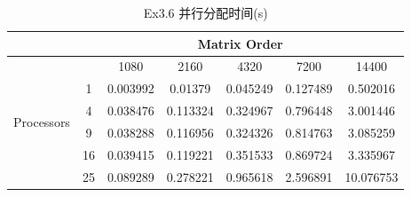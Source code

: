 \documentclass[UTF8]{article}
\begin{document}
    \begin{table}[h]
        \caption{Ex3.6 并行分配时间(s)}
        \label{tab:my-table}
        \centering
        \scalebox{0.8} {
        \begin{tabular}{|c|c|c|c|c|c|c|}
        \hline
                                    & \multicolumn{6}{c|}{Matrix Order}            \\ \hline
        \multirow{6}{*}{Processors} &    & 1080     & 2160     & 4320     & 7200     & 14400     \\ \cline{2-7} 
                                    & 1  & 0.003992 & 0.01379  & 0.045249 & 0.127489 & 0.502016  \\ \cline{2-7} 
                                    & 4  & 0.038476 & 0.113324 & 0.324967 & 0.796448 & 3.001446  \\ \cline{2-7} 
                                    & 9  & 0.038288 & 0.116956 & 0.324326 & 0.814763 & 3.085259  \\ \cline{2-7} 
                                    & 16 & 0.039415 & 0.119221 & 0.351533 & 0.869724 & 3.335967  \\ \cline{2-7} 
                                    & 25 & 0.089289 & 0.278221 & 0.965618 & 2.596891 & 10.076753 \\ \hline
        \end{tabular}}
        \end{table}
\end{document}
